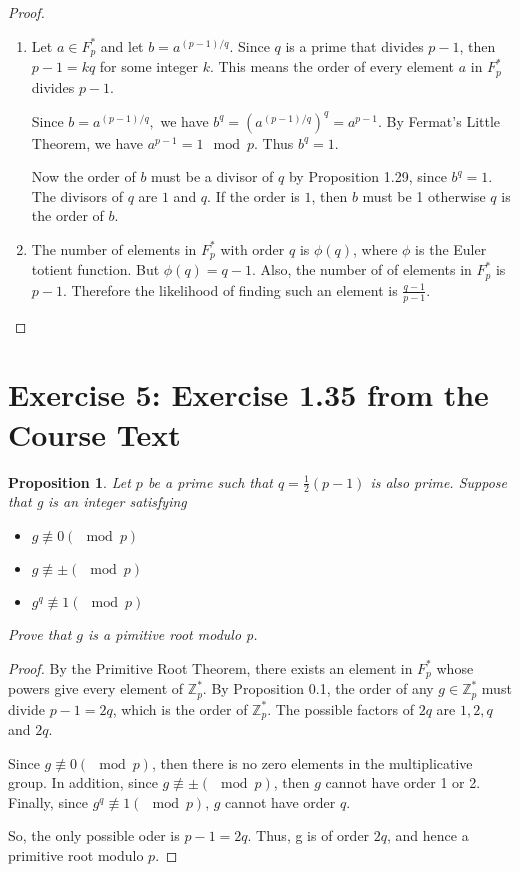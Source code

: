 \documentclass[12pt]{article}
\newtheorem{pro}[subsection]{Proposition}
\theoremstyle{definition}
\begin{document}
\begin{proof}
    \begin{enumerate}
        \item Let $a\in F^*_p$ and let $b=a^{(p-1)/q}.$ Since $q$ is a prime that divides $p-1$, 
        then $p-1 = kq$ for some integer $k$.  This means the order of every element $a$ in $F^*_p$
        divides $p-1$. 

        Since $b=a^{(p-1)/q},$ we have $b^q = (a^{(p-1)/q})^q = a^{p-1}$. By Fermat's Little Theorem,
        we have $a^{p-1} = 1 \mod p.$ Thus $b^q = 1$. 

        Now the order of $b$ must be a divisor of $q$  by Proposition 1.29, since $b^q  = 1$. The 
        divisors of $q$ are $1$ and $q$. If the order is $1$, then $b$ must be 1 otherwise $q$ is 
        the order of $b$.

        \item The number of elements in $F^*_p$ with order $q$ is $\phi(q)$, where $\phi$ is the Euler
        totient function. But $\phi(q)=q-1.$ Also, the number of of elements in $F^*_p$ is $p-1$. 
        Therefore the likelihood of finding such an element is $\frac{q-1}{p-1}.$
    \end{enumerate}
\end{proof}

\section*{Exercise 5: Exercise 1.35 from the Course Text}
\begin{pro}
    Let $p$ be a prime such that $q = \frac{1}{2}(p-1)$ is also prime. Suppose that g is an integer
    satisfying 
    \begin{itemize}
        \item $g \not\equiv 0 (\mod p)$ 
        \item $g \not\equiv \pm (\mod p)$ 
        \item $g^q \not\equiv 1 (\mod p)$ 
    \end{itemize}
    Prove that $g$ is a pimitive root modulo p.
\end{pro}
\begin{proof}
    By the Primitive Root Theorem, there exists an element in $F^*_p$ whose powers give every
    element of $\mathbb{Z}^*_p$. By Proposition 0.1, the order of any $g \in \mathbb{Z}^*_p$
    must divide $p-1 = 2q$, which is the order of $\mathbb{Z}^*_p$. The possible factors of $2q$
    are $1, 2, q$ and $2q$.
    
    Since $g \not\equiv 0 (\mod p)$, then there is no zero elements in the
    multiplicative group. In addition, since $g \not\equiv \pm (\mod p)$, then $g$ cannot have 
    order 1 or 2. Finally, since $g^q \not\equiv 1 (\mod p)$, $g$ cannot have order $q$. 

    So, the only possible oder is $p-1 = 2q$. Thus, g is  of order $2q$, and hence a primitive
    root modulo $p$.

    
\end{proof}
\end{document}
